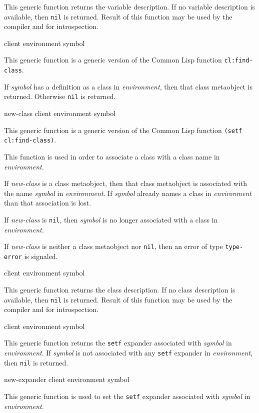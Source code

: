 This generic function returns the variable description. If no variable
description is available, then \texttt{nil} is returned. Result of this
function may be used by the compiler and for introspection.

 {client environment symbol}

This generic function is a generic version of the Common Lisp function
\texttt{cl:find-class}.

If \textit{symbol} has a definition as a class in
\textit{environment}, then that class metaobject is returned.
Otherwise \texttt{nil} is returned.

 {new-class client environment symbol}

This generic function is a generic version of the Common Lisp function
\texttt{(setf cl:find-class)}.

This function is used in order to associate a class with a class name
in \textit{environment}.

If \textit{new-class} is a class metaobject, then that class
metaobject is associated with the name \textit{symbol} in
\textit{environment}.  If \textit{symbol} already names a class in
\textit{environment} than that association is lost.

If \textit{new-class} is \texttt{nil}, then \textit{symbol} is no
longer associated with a class in \textit{environment}.

If \textit{new-class} is neither a class metaobject nor \texttt{nil},
then an error of type \texttt{type-error} is signaled.

 {client environment symbol}

This generic function returns the class description. If no class description
is available, then \texttt{nil} is returned. Result of this function may be
used by the compiler and for introspection.

 {client environment symbol}

This generic function returns the \texttt{setf} expander associated
with \textit{symbol} in \textit{environment}.  If \textit{symbol} is
not associated with any \texttt{setf} expander in
\textit{environment}, then \texttt{nil} is returned.

 {new-expander client environment symbol}

This generic function is used to set the \texttt{setf} expander
associated with \textit{symbol} in \textit{environment}.

